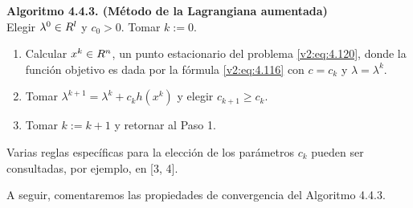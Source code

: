\noindent \textbf{Algoritmo 4.4.3. (Método de la Lagrangiana aumentada)} \\
Elegir $\lambda^0 \in R^l$ y $c_0 > 0$. Tomar $k := 0$.
\begin{enumerate}
    \item Calcular $x^k \in R^n$, un punto estacionario del problema \eqref{v2:eq:4.120}, donde la función objetivo es dada por la fórmula \eqref{v2:eq:4.116} con $c = c_k$ y $\lambda = \lambda^k$.
    \item Tomar $\lambda^{k+1} = \lambda^k + c_k h(x^k)$ y elegir $c_{k+1} \ge c_k$.
    \item Tomar $k := k + 1$ y retornar al Paso 1.
\end{enumerate}

Varias reglas específicas para la elección de los parámetros $c_k$ pueden ser consultadas, por ejemplo, en [3, 4].


A seguir, comentaremos las propiedades de convergencia del Algoritmo 4.4.3.

